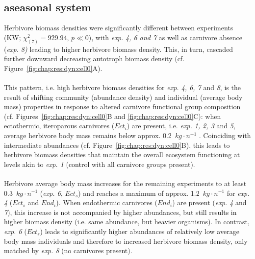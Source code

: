 \subsection{aseasonal system}
\label{chap:res:popind:cell0}
Herbivore biomass densities were significantly different between experiments  (KW; $\chi^{2}_{(7)} = 929.94$, $p \ll 0$), with \textit{exp. 4, 6 and 7} as well as carnivore absence (\textit{exp. 8)} leading to higher herbivore biomass density. 
This, in turn, cascaded further downward decreasing autotroph biomass density (cf. Figure~\ref{fig:chap:res:dyn:cell0}A).
\\\\
This pattern, i.e. high herbivore biomass densities for \textit{exp. 4, 6, 7} and \textit{8}, is the result of shifting community (abundance density) and individual (average body mass) properties in response to altered carnivore functional group composition (cf. Figures~\ref{fig:chap:res:dyn:cell0}B and \ref{fig:chap:res:dyn:cell0}C): when ectothermic, iteroparous carnivores ($Ect_i$) are present, i.e. \textit{exp. 1, 2, 3} and \textit{5}, average herbivore body mass remains below approx. 0.2~$kg\cdot n^{-1}$ . 
Coinciding with intermediate abundances (cf. Figure~\ref{fig:chap:res:dyn:cell0}B), 
this leads to herbivore biomass densities that maintain the overall ecosystem functioning at levels akin to \textit{exp. 1} (control with all carnivore groups present).\\\\
Herbivore average body mass increases for the remaining experiments to at least 0.3~$kg\cdot n^{-1}$ (\textit{exp. 6}, $Ect_s$) and reaches a maximum of approx. 1.2~$kg\cdot n^{-1}$ for \textit{exp. 4}  ($Ect_s$ and $End_i$). 
When endothermic carnivores ($End_i$) are present (\textit{exp. 4} and \textit{7}), this increase is not accompanied by higher abundances, but still results in higher biomass density (i.e. same abundance, but heavier organisms). 
In contrast, \textit{exp. 6} ($Ect_s$) leads to significantly higher abundances of relatively low average body mass individuals and therefore to increased herbivore biomass density, only matched by \textit{exp. 8} (no carnivores present).

